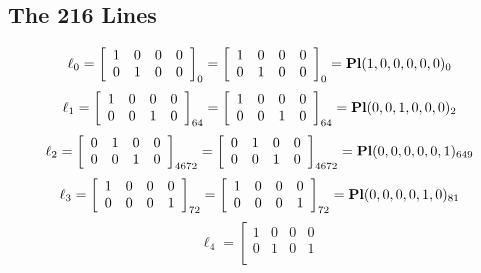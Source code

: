 \documentclass{article}
\begin{document}
{\subsection*{The 216 Lines}
$$
\ell_{0} = 
\left[
\begin{array}{*{4}{r}}
1 & 0 & 0 & 0\\
0 & 1 & 0 & 0\\
\end{array}
\right]
_{0}
=
\left[
\begin{array}{*{4}c}
1  & 0  & 0  & 0\\
0  & 1  & 0  & 0\\
\end{array}
\right]_{0}
={\rm\bf Pl}(1,0,0,0,0,0 )_{0}$$
$$
\ell_{1} = 
\left[
\begin{array}{*{4}{r}}
1 & 0 & 0 & 0\\
0 & 0 & 1 & 0\\
\end{array}
\right]
_{64}
=
\left[
\begin{array}{*{4}c}
1  & 0  & 0  & 0\\
0  & 0  & 1  & 0\\
\end{array}
\right]_{64}
={\rm\bf Pl}(0,0,1,0,0,0 )_{2}$$
$$
\ell_{2} = 
\left[
\begin{array}{*{4}{r}}
0 & 1 & 0 & 0\\
0 & 0 & 1 & 0\\
\end{array}
\right]
_{4672}
=
\left[
\begin{array}{*{4}c}
0  & 1  & 0  & 0\\
0  & 0  & 1  & 0\\
\end{array}
\right]_{4672}
={\rm\bf Pl}(0,0,0,0,0,1 )_{649}$$
$$
\ell_{3} = 
\left[
\begin{array}{*{4}{r}}
1 & 0 & 0 & 0\\
0 & 0 & 0 & 1\\
\end{array}
\right]
_{72}
=
\left[
\begin{array}{*{4}c}
1  & 0  & 0  & 0\\
0  & 0  & 0  & 1\\
\end{array}
\right]_{72}
={\rm\bf Pl}(0,0,0,0,1,0 )_{81}$$
$$
\ell_{4} = 
\left[
\begin{array}{*{4}{r}}
1 & 0 & 0 & 0\\
0 & 1 & 0 & 1\\
\end{array}
$$}
\end{document}
